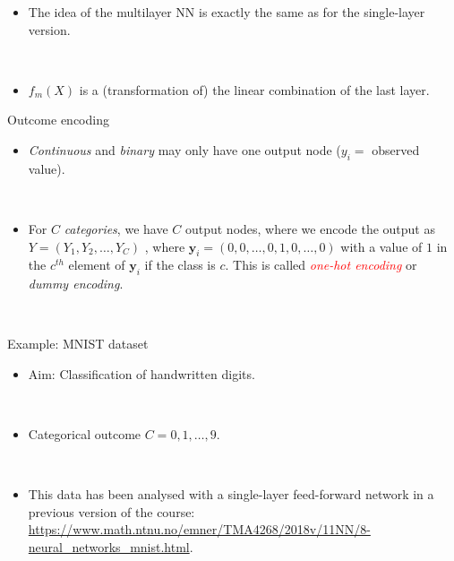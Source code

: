 \documentclass[
  10pt,
  ignorenonframetext,
]{beamer}
\providecommand{\tightlist}{%
  \setlength{\itemsep}{0pt}\setlength{\parskip}{0pt}}
\begin{document}
\begin{frame}
\begin{itemize}
\tightlist
\item
  The idea of the multilayer NN is exactly the same as for the
  single-layer version.
\end{itemize}

\(~\)

\begin{itemize}
\tightlist
\item
  \(f_m(X)\) is a (transformation of) the linear combination of the last
  layer.
\end{itemize}
\end{frame}

\begin{frame}
\begin{block}{Outcome encoding}
\protect\hypertarget{outcome-encoding}{}
\(~\)

\begin{itemize}
\tightlist
\item
  \emph{Continuous} and \emph{binary} may only have one output node
  (\(y_i=\) observed value).
\end{itemize}

\(~\)

\begin{itemize}
\tightlist
\item
  For \(C\) \emph{categories}, we have \(C\) output nodes, where we
  encode the output as \(Y = (Y_1, Y_2, \ldots, Y_C)\) , where
  \({\boldsymbol y}_i=(0,0,\ldots,0,1,0,\ldots,0)\) with a value of
  \(1\) in the \(c^{th}\) element of \({\boldsymbol y}_i\) if the class
  is \(c\). This is called \emph{\textcolor{red}{one-hot encoding}} or
  \emph{dummy encoding}.
\end{itemize}

\(~\)
\end{block}
\end{frame}

\begin{frame}
\begin{block}{Example: MNIST dataset}
\protect\hypertarget{example-mnist-dataset}{}
\(~\)

\begin{itemize}
\tightlist
\item
  Aim: Classification of handwritten digits.
\end{itemize}

\(~\)

\begin{itemize}
\tightlist
\item
  Categorical outcome \(C=0,1,\ldots,9\).
\end{itemize}

\(~\)

\begin{itemize}
\tightlist
\item
  This data has been analysed with a single-layer feed-forward network
  in a previous version of the course:
  \url{https://www.math.ntnu.no/emner/TMA4268/2018v/11NN/8-neural_networks_mnist.html}.
\end{itemize}
\end{block}
\end{frame}
\end{document}
